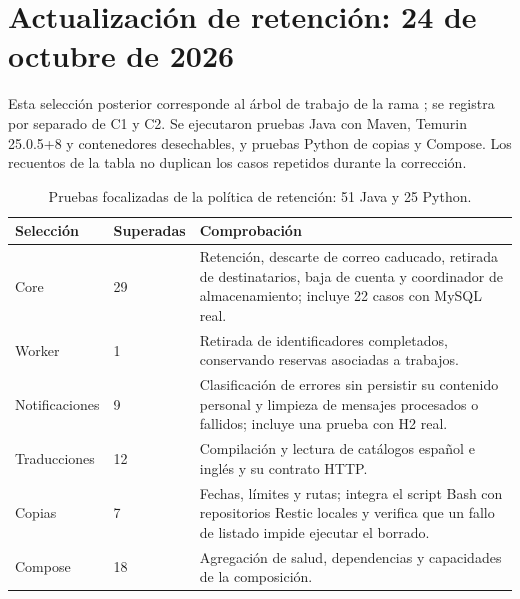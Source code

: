 \section{Actualización de retención: 24 de octubre de 2026}
\label{sec:pruebas-retencion}

Esta selección posterior corresponde al árbol de trabajo de la rama ; se registra por separado de C1 y C2. Se ejecutaron pruebas Java con Maven, Temurin 25.0.5+8 y contenedores desechables, y pruebas Python de copias y Compose. Los recuentos de la tabla no duplican los casos repetidos durante la corrección.

\begin{table}[H]
\centering\small
\begin{tabularx}{\textwidth}{p{}p{}X}
\toprule
\textbf{Selección} & \textbf{Superadas} & \textbf{Comprobación}\\
\midrule
Core & 29 & Retención, descarte de correo caducado, retirada de destinatarios, baja de cuenta y coordinador de almacenamiento; incluye 22 casos con MySQL real.\\
Worker & 1 & Retirada de identificadores completados, conservando reservas asociadas a trabajos.\\
Notificaciones & 9 & Clasificación de errores sin persistir su contenido personal y limpieza de mensajes procesados o fallidos; incluye una prueba con H2 real.\\
Traducciones & 12 & Compilación y lectura de catálogos español e inglés y su contrato HTTP.\\
Copias & 7 & Fechas, límites y rutas; integra el script Bash con repositorios Restic locales y verifica que un fallo de listado impide ejecutar el borrado.\\
Compose & 18 & Agregación de salud, dependencias y capacidades de la composición.\\
\bottomrule
\end{tabularx}
\caption{Pruebas focalizadas de la política de retención: 51 Java y 25 Python.}
\end{table}
